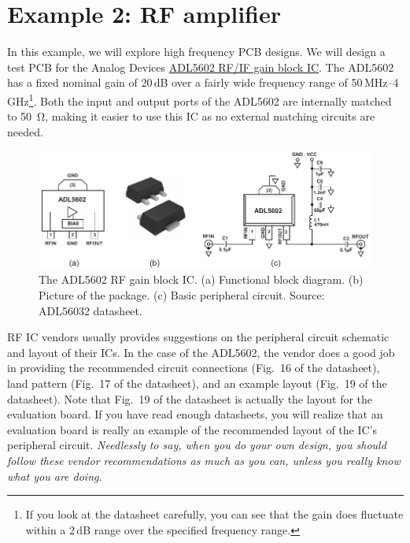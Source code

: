 \documentclass[12pt,letterpaper]{scrartcl}
\begin{document}
\newpage
\section{Example 2: RF amplifier}


In this example, we will explore high frequency PCB designs. We will design a test PCB for the Analog Devices \href{http://www.analog.com/media/en/technical-documentation/evaluation-documentation/ADL5602.pdf}{ADL5602 RF/IF gain block IC}. The ADL5602 has a fixed nominal gain of 20\,dB over a fairly wide frequency range of 50\,MHz--4\,GHz\footnote{If you look at the datasheet carefully, you can see that the gain does fluctuate within a 2\,dB range over the specified frequency range.}. Both the input and output ports of the ADL5602 are internally matched to \SI{50}{\ohm}, making it easier to use this IC as no external matching circuits are needed. 

	\begin{figure}[h]
		\centering
		\includegraphics[width=6in]{adl5602}
		\caption{The ADL5602 RF gain block IC. (a) Functional block diagram. (b) Picture of the package. (c) Basic peripheral circuit. Source: ADL56032 datasheet.}
		\label{fig:adl5602}
	\end{figure}

RF IC vendors usually provides suggestions on the peripheral circuit schematic and layout of their ICs. In the case of the ADL5602, the vendor does a good job in providing the recommended circuit connections (Fig.~16 of the datasheet), land pattern (Fig.~17 of the datasheet), and an example layout (Fig.~19 of the datasheet). Note that Fig.~19 of the datasheet is actually the layout for the evaluation board. If you have read enough datasheets, you will realize that an evaluation board is really an example of the recommended layout of the IC's peripheral circuit. \textit{Needlessly to say, when you do your own design, you should follow these vendor recommendations as much as you can, unless you really know what you are doing.} 
\end{document}
